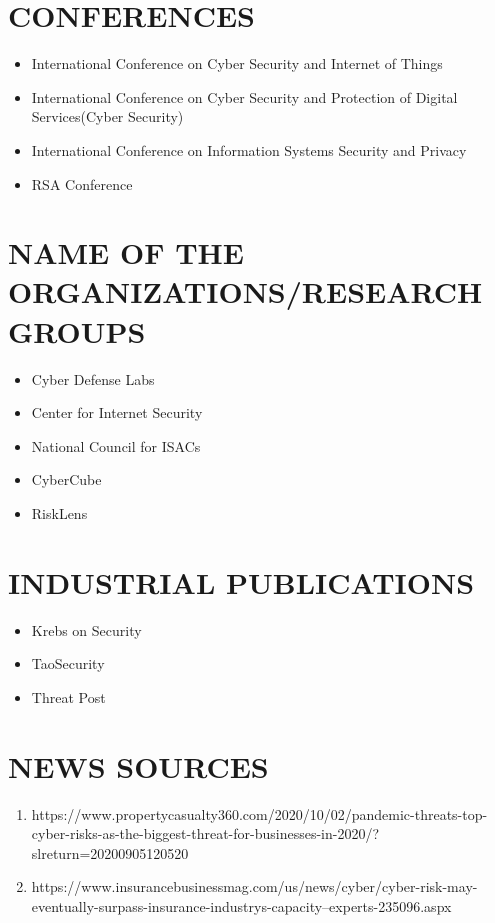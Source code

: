 \documentclass[conference]{IEEEtran}
\begin{document}
\section{CONFERENCES}
\begin{itemize}
    \item International Conference on Cyber Security and Internet of Things
\item International Conference on Cyber Security and Protection of Digital Services(Cyber Security)
\item 	International Conference on Information Systems Security and Privacy
\item	RSA Conference
\end{itemize}

\section{NAME OF THE ORGANIZATIONS/RESEARCH GROUPS}
\begin{itemize}
    \item Cyber Defense Labs
    \item Center for Internet Security
\item	National Council for ISACs
\item CyberCube
\item	RiskLens
\end{itemize}

\section{INDUSTRIAL PUBLICATIONS}
\begin{itemize}
    \item Krebs on Security
    \item TaoSecurity
    \item Threat Post
\end{itemize}


\section{NEWS SOURCES}
\begin{enumerate}
    \item https://www.propertycasualty360.com/2020/10/02/pandemic-threats-top-cyber-risks-as-the-biggest-threat-for-businesses-in-2020/?slreturn=20200905120520 
    \item https://www.insurancebusinessmag.com/us/news/cyber/cyber-risk-may-eventually-surpass-insurance-industrys-capacity--experts-235096.aspx 
\end{enumerate}
\end{document}
